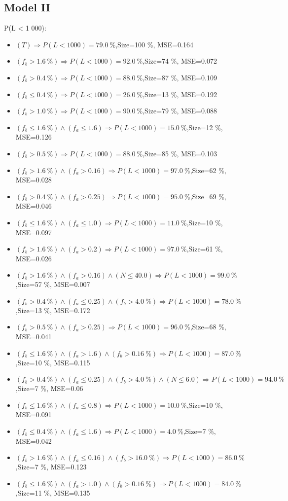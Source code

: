 \documentclass[numbered]{CSL}
\begin{document}
\subsection{Model II}
P(L < 1 000):
\begin{itemize}
\item $(T) \Rightarrow P(L < 1 000) = 79.0~\%$,\hfill Size=100 \%, MSE=0.164
\item $(f_b > 1.6~\%) \Rightarrow P(L < 1 000) = 92.0~\%$,\hfill Size=74 \%, MSE=0.072
\item $(f_b > 0.4~\%) \Rightarrow P(L < 1 000) = 88.0~\%$,\hfill Size=87 \%, MSE=0.109
\item $(f_b \leq 0.4~\%) \Rightarrow P(L < 1 000) = 26.0~\%$,\hfill Size=13 \%, MSE=0.192
\item $(f_b > 1.0~\%) \Rightarrow P(L < 1 000) = 90.0~\%$,\hfill Size=79 \%, MSE=0.088
\item $(f_b \leq 1.6~\%) \land (f_a \leq 1.6) \Rightarrow P(L < 1 000) = 15.0~\%$,\hfill Size=12 \%, MSE=0.126
\item $(f_b > 0.5~\%) \Rightarrow P(L < 1 000) = 88.0~\%$,\hfill Size=85 \%, MSE=0.103
\item $(f_b > 1.6~\%) \land (f_a > 0.16) \Rightarrow P(L < 1 000) = 97.0~\%$,\hfill Size=62 \%, MSE=0.028
\item $(f_b > 0.4~\%) \land (f_a > 0.25) \Rightarrow P(L < 1 000) = 95.0~\%$,\hfill Size=69 \%, MSE=0.046
\item $(f_b \leq 1.6~\%) \land (f_a \leq 1.0) \Rightarrow P(L < 1 000) = 11.0~\%$,\hfill Size=10 \%, MSE=0.097
\item $(f_b > 1.6~\%) \land (f_a > 0.2) \Rightarrow P(L < 1 000) = 97.0~\%$,\hfill Size=61 \%, MSE=0.026
\item $(f_b > 1.6~\%) \land (f_a > 0.16) \land (N \leq 40.0) \Rightarrow P(L < 1 000) = 99.0~\%$,\hfill Size=57 \%, MSE=0.007
\item $(f_b > 0.4~\%) \land (f_a \leq 0.25) \land (f_b > 4.0~\%) \Rightarrow P(L < 1 000) = 78.0~\%$,\hfill Size=13 \%, MSE=0.172
\item $(f_b > 0.5~\%) \land (f_a > 0.25) \Rightarrow P(L < 1 000) = 96.0~\%$,\hfill Size=68 \%, MSE=0.041
\item $(f_b \leq 1.6~\%) \land (f_a > 1.6) \land (f_b > 0.16~\%) \Rightarrow P(L < 1 000) = 87.0~\%$,\hfill Size=10 \%, MSE=0.115
\item $(f_b > 0.4~\%) \land (f_a \leq 0.25) \land (f_b > 4.0~\%) \land (N \leq 6.0) \Rightarrow P(L < 1 000) = 94.0~\%$,\hfill Size=7 \%, MSE=0.06
\item $(f_b \leq 1.6~\%) \land (f_a \leq 0.8) \Rightarrow P(L < 1 000) = 10.0~\%$,\hfill Size=10 \%, MSE=0.091
\item $(f_b \leq 0.4~\%) \land (f_a \leq 1.6) \Rightarrow P(L < 1 000) = 4.0~\%$,\hfill Size=7 \%, MSE=0.042
\item $(f_b > 1.6~\%) \land (f_a \leq 0.16) \land (f_b > 16.0~\%) \Rightarrow P(L < 1 000) = 86.0~\%$,\hfill Size=7 \%, MSE=0.123
\item $(f_b \leq 1.6~\%) \land (f_a > 1.0) \land (f_b > 0.16~\%) \Rightarrow P(L < 1 000) = 84.0~\%$,\hfill Size=11 \%, MSE=0.135
\end{itemize}
\end{document}
